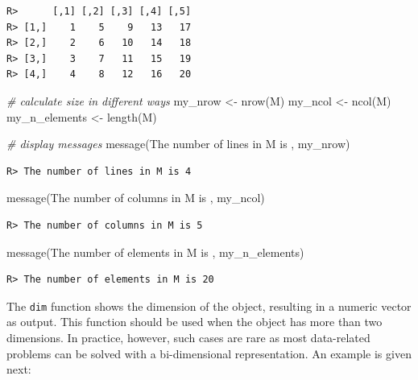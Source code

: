 \documentclass[
  12pt,
]{book}
\newenvironment{Shaded}{\begin{snugshade}}{\end{snugshade}}
\newcommand{\CommentTok}[1]{\textcolor[rgb]{0.37,0.37,0.37}{\textit{#1}}}
\newcommand{\FunctionTok}[1]{\textcolor[rgb]{0,0,0}{#1}}
\newcommand{\NormalTok}[1]{#1}
\newcommand{\OtherTok}[1]{\textcolor[rgb]{0.37,0.37,0.37}{#1}}
\newcommand{\StringTok}[1]{\textcolor[rgb]{0.5,0.5,0.5}{#1}}
\begin{document}
\begin{verbatim}
R>      [,1] [,2] [,3] [,4] [,5]
R> [1,]    1    5    9   13   17
R> [2,]    2    6   10   14   18
R> [3,]    3    7   11   15   19
R> [4,]    4    8   12   16   20
\end{verbatim}

\begin{Shaded}
\begin{Highlighting}[]
\CommentTok{\# calculate size in different ways}
\NormalTok{my\_nrow }\OtherTok{\textless{}{-}} \FunctionTok{nrow}\NormalTok{(M)}
\NormalTok{my\_ncol }\OtherTok{\textless{}{-}} \FunctionTok{ncol}\NormalTok{(M)}
\NormalTok{my\_n\_elements }\OtherTok{\textless{}{-}} \FunctionTok{length}\NormalTok{(M)}

\CommentTok{\# display messages}
\FunctionTok{message}\NormalTok{(}\StringTok{\textquotesingle{}The number of lines in M is \textquotesingle{}}\NormalTok{, my\_nrow)}
\end{Highlighting}
\end{Shaded}

\begin{verbatim}
R> The number of lines in M is 4
\end{verbatim}

\begin{Shaded}
\begin{Highlighting}[]
\FunctionTok{message}\NormalTok{(}\StringTok{\textquotesingle{}The number of columns in M is \textquotesingle{}}\NormalTok{, my\_ncol)}
\end{Highlighting}
\end{Shaded}

\begin{verbatim}
R> The number of columns in M is 5
\end{verbatim}

\begin{Shaded}
\begin{Highlighting}[]
\FunctionTok{message}\NormalTok{(}\StringTok{\textquotesingle{}The number of elements in M is \textquotesingle{}}\NormalTok{, my\_n\_elements)}
\end{Highlighting}
\end{Shaded}

\begin{verbatim}
R> The number of elements in M is 20
\end{verbatim}

The \texttt{dim} function shows the dimension of the object, resulting in a numeric vector as output. This function should be used when the object has more than two dimensions. In practice, however, such cases are rare as most data-related problems can be solved with a bi-dimensional representation. An example is given next:
\end{document}
